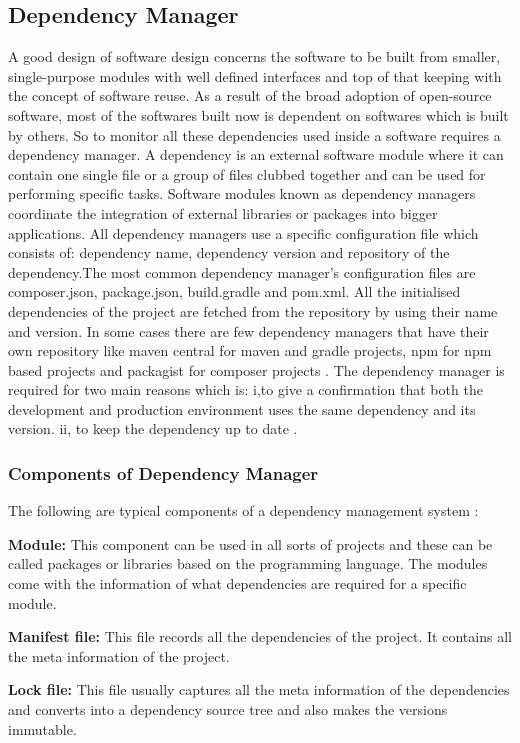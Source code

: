 \subsection{Dependency Manager}
A good design of software design concerns the software to be built from smaller, single-purpose modules with well defined interfaces and top of that keeping with the concept of software reuse. As a result of the broad adoption of open-source software, most of the softwares built now is dependent on softwares which is built by others. So to monitor all these dependencies used inside a software requires a dependency manager. A dependency is an external software module where it can contain one single file or a group of files clubbed together and can be used for performing specific tasks. Software modules known as dependency managers coordinate the integration of external libraries or packages into bigger applications. All dependency managers use a specific configuration file which consists of: dependency name, dependency version and repository of the dependency.The most common dependency manager’s configuration files are composer.json, package.json, build.gradle and pom.xml. All the initialised dependencies of the project are fetched from the repository by using their name and version. In some cases there are few dependency managers that have their own repository like maven central for maven and gradle projects, npm for npm based projects and packagist for composer projects \cite{Ma2017}. The dependency manager is required for two main reasons which is: i,to give a confirmation that both the development and production environment uses the same dependency and its version. ii, to keep the dependency up to date \cite{Dm2018}.
%
\subsubsection{Components of Dependency Manager}
The following are typical components of a dependency management system \cite{DataWH}:

\textbf{Module:} This component can be used in all sorts of projects and these can be called packages or libraries based on the programming language. The modules come with the information of what dependencies are required for a specific module.
	
\textbf{Manifest file:} This file records all the dependencies of the project. It contains all the meta information of the project. 
	
\textbf{Lock file:} This file usually captures all the meta information of the dependencies and converts into a dependency source tree and also makes the versions immutable.
	
